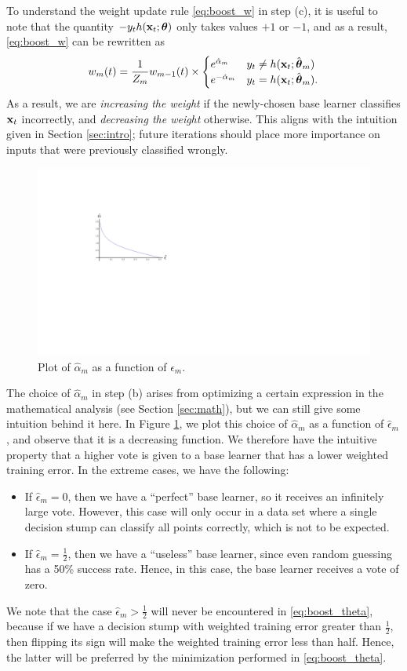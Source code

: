 \documentclass[english]{article}
\begin{document}
To understand the weight update rule \eqref{eq:boost_w} in step (c), it is useful to note that the quantity $-y_t h(\mathbf{x}_t;\boldsymbol{\theta})$ only takes values $+1$ or $-1$, and as a result, \eqref{eq:boost_w} can be rewritten as 
    \begin{equation}
        w_m(t) = \frac{1}{Z_m} w_{m-1}(t) \times
        \begin{cases}
            e^{\hat{\alpha}_m} & y_t \ne h(\mathbf{x}_t;\hat{\boldsymbol{\theta}}_m) \\
            e^{-\hat{\alpha}_m} & y_t = h(\mathbf{x}_t;\hat{\boldsymbol{\theta}}_m).
        \end{cases} \label{eq:update}
    \end{equation}
As a result, we are {\em increasing the weight} if the newly-chosen base learner classifies $\mathbf{x}_t$ incorrectly, and {\em decreasing the weight} otherwise.  This aligns with the intuition given in Section \ref{sec:intro}; future iterations should place more importance on inputs that were previously classified wrongly. 

    \begin{figure}
        \centering
        \includegraphics[width=.4\textwidth]{alpha_plot}
        \par
        \caption{Plot of $\hat{\alpha}_m$ as a function of $\hat{\epsilon}_m$. \label{fig:alpha_plot}}
    \end{figure}   

The choice of $\hat{\alpha}_m$ in step (b) arises from optimizing a certain expression in the mathematical analysis (see Section \ref{sec:math}), but we can still give some intuition behind it here.  In Figure \ref{fig:alpha_plot}, we plot this choice of $\hat{\alpha}_m$ as a function of $\hat{\epsilon}_m$, and observe that it is a decreasing function.  We therefore have the intuitive property that a higher vote is given to a base learner that has a lower weighted training error.  In the extreme cases, we have the following:
\begin{itemize}
    \item If $\hat{\epsilon}_m = 0$, then we have a ``perfect'' base learner, so it receives an infinitely large vote.  However, this case will only occur in a data set where a single decision stump can classify all points correctly, which is not to be expected.
    \item If $\hat{\epsilon}_m = \frac{1}{2}$, then we have a ``useless'' base learner, since even random guessing has a 50\% success rate.  Hence, in this case, the base learner receives a vote of zero.
\end{itemize}
We note that the case $\hat{\epsilon}_m > \frac{1}{2}$ will never be encountered in \eqref{eq:boost_theta}, because if we have a decision stump with weighted training error greater than $\frac{1}{2}$, then flipping its sign will make the weighted training error less than half.  Hence, the latter will be preferred by the minimization performed in \eqref{eq:boost_theta}.
\end{document}
